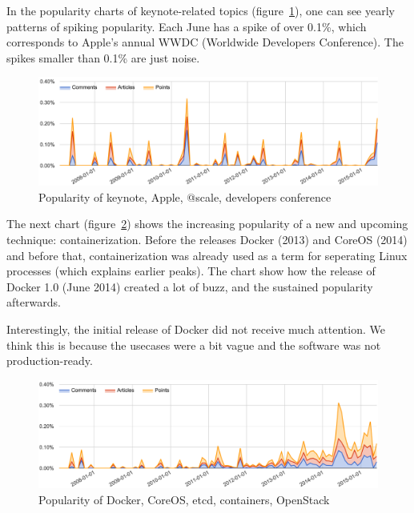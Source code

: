 In the popularity charts of keynote-related topics (figure~\ref{fig:trend_keynote}), one can see yearly patterns of spiking popularity. Each June has a spike of over 0.1\%, which corresponds to Apple's annual WWDC (Worldwide Developers Conference). The spikes smaller than 0.1\% are just noise.
\begin{figure}[H] %
	\caption{Popularity of keynote, Apple, @scale, developers conference}
	\label{fig:trend_keynote}
	\centering
	\includegraphics[width=14cm]{topic_trends/keynote_relative}
\end{figure}
\pagebreak
The next chart (figure~\ref{fig:trend_docker}) shows the increasing popularity of a new and upcoming technique: containerization. Before the releases Docker (2013) and CoreOS (2014) and before that, containerization was already used as a term for seperating Linux processes (which explains earlier peaks). The chart show how the release of Docker 1.0 (June 2014) created a lot of buzz, and the sustained popularity afterwards.

Interestingly, the initial release of Docker did not receive much attention. We think this is because the usecases were a bit vague and the software was not production-ready.
\begin{figure}[H] %
	\caption{Popularity of Docker, CoreOS, etcd, containers, OpenStack}
	\label{fig:trend_docker}
	\centering
	\includegraphics[width=14cm]{topic_trends/docker_relative}
\end{figure}


